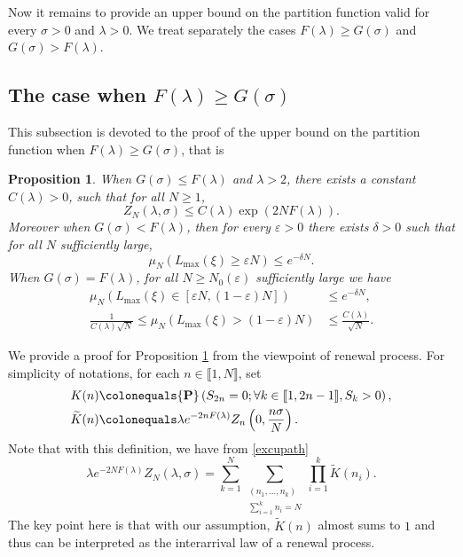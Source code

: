 \documentclass[reqno,11pt]{amsart}
\numberwithin{equation}{section}
\newcommand{\gep}{\varepsilon}       %
\newcommand{\gl}{\lambda}
\newcommand{\bP}{{\ensuremath{\mathbf P}} }
\newcommand{\lint}{\llbracket}
\newcommand{\rint}{\rrbracket}
\newtheorem{proposition}[theorem]{Proposition}
\renewcommand{\tilde}{\widetilde}
\newcommand{\sumtwo}[2]{\sum_{\substack{#1 \\ #2}}} %
\begin{document}
\noindent Now it remains to provide an upper bound on the partition function valid for every $\sigma  > 0$ and $\gl  > 0$. We treat separately the cases $F(\gl)\ge G(\sigma)$ and $G(\sigma)> F(\gl)$.



\subsection{The case when $F(\gl)\ge G(\sigma)$}\label{sec:pinningstr}
This subsection is devoted to the proof of the upper bound on the partition function when $  F(\lambda) \ge G(\sigma)$, that is


\begin{proposition} \label{th:upbpinningstr}
When $G(\sigma) \le F(\lambda)$ and $\gl>2$, there exists a constant $C(\lambda)>0$, such that for all $N\geq 1$,
\begin{equation}\label{zupper}
Z_N(\lambda, \sigma)\leq C(\lambda) \exp\left(2NF(\lambda)\right).
\end{equation}
 Moreover when $G(\sigma) < F(\lambda)$, then for every $\gep>0$ there exists $\delta>0$ such that for all $N$ sufficiently large,
\begin{equation}\label{pindom:excurdecay}
 \mu_N\left( L_{\max}(\xi) \ge \gep N \right) \le  e^{-\delta N}.
\end{equation}
When $G(\sigma) = F(\lambda)$, for all $N\ge N_0(\gep)$ sufficiently large we have
\begin{equation}
\begin{split}\label{equalcase}
 \mu_N\left( L_{\max}(\xi) \in [\gep N,(1-\gep) N] \right) &\le e^{-\delta N}, \\
\frac{1}{C(\gl) \sqrt{N}} \le \mu_N\left( L_{\max}(\xi)> (1-\gep )N \right)&\le  \frac{C(\gl)}{\sqrt{N}}.  
\end{split}
\end{equation}

\end{proposition}



We provide a proof for Proposition \ref{th:upbpinningstr} from the viewpoint of renewal process. For simplicity of notations, for each $n\in \lint 1, N\rint$, set
\begin{equation}\label{defKn}
\begin{split}
K(n)&\colonequals \bP\left( S_{2n}=0;  \forall k \in \lint 1, 2n-1 \rint, S_k>0 \right),\\
 \widetilde{K}(n) &\colonequals \lambda e^{-2nF(\lambda)} Z_n \left(0, \frac{n\sigma}{N}\right).
\end{split}
\end{equation}
Note that with this definition,  we have from \eqref{excupath}
\begin{equation}\label{renewexpress}
 \gl e^{-2N F(\gl)}Z_N(\gl,\sigma)= \sum_{k=1}^N \sumtwo{(n_1,\dots,n_k)}{ \sum_{i=1}^k n_i=N} \prod_{i=1}^{k} \tilde K(n_i).
\end{equation}
The key point here is that with our assumption, $\tilde K(n)$ almost sums to $1$ and thus can be interpreted as the interarrival law of a renewal process.
\end{document}
